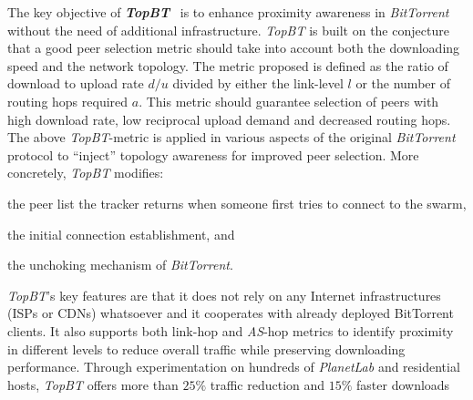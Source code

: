 The key objective of \textbf{\emph{TopBT}}~\cite{RTLCGZ2010} is to enhance
proximity awareness in \emph{BitTorrent}
without the need of additional infrastructure. 
\emph{TopBT} is built on the conjecture that
a good peer selection metric should take into account both the
downloading speed and the network topology. The metric proposed is defined as
the ratio of download to upload rate ${d}/{u}$
divided by either the link-level $l$ or the number of routing hops required $a$.
This metric should guarantee selection of peers with high download rate, low
reciprocal upload demand and decreased routing hops.
The above \emph{TopBT}-metric is applied in various
aspects of the original \emph{BitTorrent} protocol to ``inject'' topology
awareness for improved peer selection. More concretely, \emph{TopBT} modifies: 
\begin{inparaenum}[1)]
\item the peer list the tracker returns when someone first tries
to connect to the swarm, 
\item the initial connection establishment, and 
\item the unchoking mechanism of \emph{BitTorrent}.
\end{inparaenum}
\emph{TopBT}'s key features are that it does not rely on any Internet infrastructures
(ISPs or CDNs) whatsoever and it cooperates with already deployed BitTorrent clients.
It also supports both link-hop and \emph{AS}-hop metrics to identify proximity in
different levels to reduce overall traffic while preserving downloading
performance.
%
Through experimentation on hundreds of {\it PlanetLab} and residential hosts,
\emph{TopBT} offers more than $25\%$ traffic reduction and $15\%$ faster downloads
